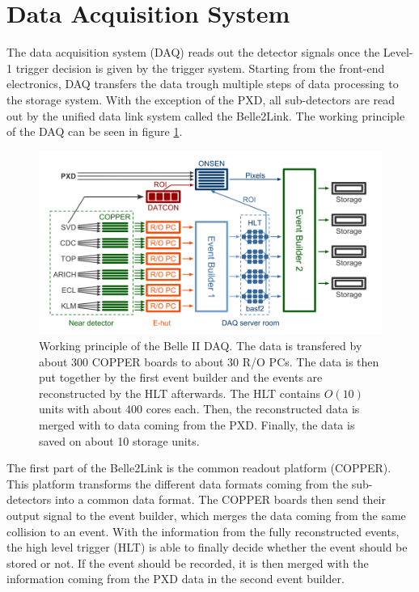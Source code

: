 \documentclass[a4paper,11pt,twosided,final,german,openbib,pdftex,listof=totoc,bibliography=totoc]{scrbook}
\begin{document}
\section{Data Acquisition System}
\label{sec:DAQ}

The data acquisition system (DAQ) reads out the detector signals once the Level-1 trigger decision is given by the trigger system. Starting from the front-end electronics, DAQ transfers the data trough multiple steps of data processing to the storage system. With the exception of the PXD, all sub-detectors are read out by the unified data link system called the Belle2Link. The working principle of the DAQ can be seen in figure \ref{fig:DAQ}.

\begin{figure}[h!]
	\centering
	\includegraphics[width=\textwidth]{Bilder/DAQ}
	\caption[Working Principle of the DAQ]{Working principle of the Belle II DAQ. The data is transfered by about 300 COPPER boards to about 30 R/O PCs. The data is then put together by the first event builder and the events are reconstructed by the HLT afterwards. The HLT contains $O(10)$ units with about 400 cores each. Then, the reconstructed data is merged with to data coming from the PXD. Finally, the data is saved on about 10 storage units. \cite{Filippo:1097}}
	\label{fig:DAQ}
\end{figure}

The first part of the Belle2Link is the common readout platform (COPPER). This platform transforms the different data formats coming from the sub-detectors into a common data format. The COPPER boards then send their output signal to the event builder, which merges the data coming from the same collision to an event. With the information from the fully reconstructed events, the high level trigger (HLT) is able to finally decide whether the event should be stored or not. If the event should be recorded, it is then merged with the information coming from the PXD data in the second event builder.
\end{document}
